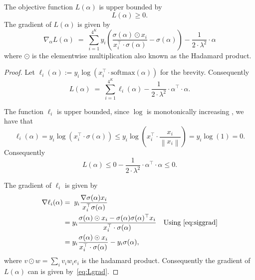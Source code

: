 \documentclass[11pt]{article}
\newcommand{\norm}[1]{ \left\| #1 \right\|}      %
\begin{document}
\begin{lemma}
The objective function $L(\alpha)$ is upper bounded by 
\begin{equation}
L(\alpha) \geq 0.
\end{equation}
The gradient of $L(\alpha)$ is given by
\begin{equation}\label{eq:Lgrad}
\nabla_{\alpha}  L(\alpha) \; =\;  \sum_{i=1}^{4^K} y_i \left(\frac{\sigma(\alpha) \odot  x_i}{ x_i^{\top} \cdot \sigma(\alpha) } - \sigma(\alpha)\right) - \frac{1}{2 \cdot \lambda^2} \cdot \alpha
\end{equation}
where $\odot$ is the  elementwise multiplication also known as the Hadamard product.
\end{lemma}
\begin{proof}
Let $\ell_i(\alpha) := y_i \log \left( x_i^{\top} \cdot \textrm{softmax}(\alpha) \right)$ for the brevity. Consequently
\begin{equation}
L(\alpha) \; =  \;\sum_{i=1}^{4^K} \ell_i(\alpha)  - \frac{1}{2 \cdot \lambda^2} \cdot \alpha^{\top} \cdot \alpha.
\end{equation}

The function $\ell_i$ is upper bounded, since $\log$ is monotonically increasing , we have that 
$$ \ell_i(\alpha) = y_i \log \left( x_i^{\top} \cdot \sigma(\alpha) \right) \leq y_i \log \left( x_i^{\top} \cdot \frac{x_i}{\norm{x_i}}\right) = y_i \log \left( 1\right) =0.$$
Consequently
\[ L(\alpha) \leq 0 - \frac{1}{2 \cdot \lambda^2} \cdot \alpha^{\top} \cdot \alpha \leq 0.\]


The gradient of $\ell_i$ is given by
\begin{align}
    \nabla \ell_i(\alpha) & = \; y_i\frac{\nabla \sigma(\alpha) x_i}{ x_i^{\top} \sigma(\alpha) } \nonumber \\
          & =  y_i\frac{\sigma(\alpha) \odot  x_i -\sigma(\alpha) \sigma(\alpha)^\top x_i}{ x_i^{\top} \cdot \sigma(\alpha) }
          & \mbox{Using~\eqref{eq:siggrad}} \nonumber  \\
          & = y_i \frac{\sigma(\alpha) \odot  x_i}{ x_i^{\top} \cdot \sigma(\alpha) } - y_i\sigma(\alpha), \label{eq:ligrad}
\end{align}
where $v\odot w = \sum_{i} v_i w_i e_i$ is the hadamard product. Consequently the gradient of $L(\alpha)$ can is given by~\eqref{eq:Lgrad}.

\end{proof}
\end{document}

